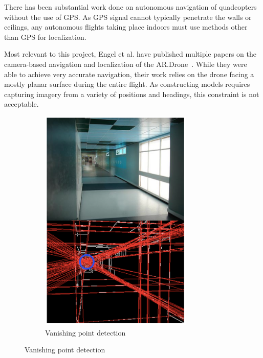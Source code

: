 	There has been substantial work done on autonomous navigation of quadcopters without the use of GPS. As GPS signal cannot typically penetrate the walls or ceilings, any autonomous flights taking place indoors must use methods other than GPS for localization. 

    Most relevant to this project, Engel et al. have published multiple papers on the camera-based navigation and localization of the AR.Drone~\cite{Engel, Engel2}. While they were able to achieve very accurate navigation, their work relies on the drone facing a mostly planar surface during the entire flight. As constructing models requires capturing imagery from a variety of positions and headings, this constraint is not acceptable.

	\begin{figure}[ht]
            \centering
            \begin{subfigure}[b]{0.5\textwidth}
                    \centering
                    \includegraphics[width=0.8\textwidth]{../images/Bills1.png}
                    \caption{Vanishing point detection}
            \end{subfigure}%

\end{figure}
